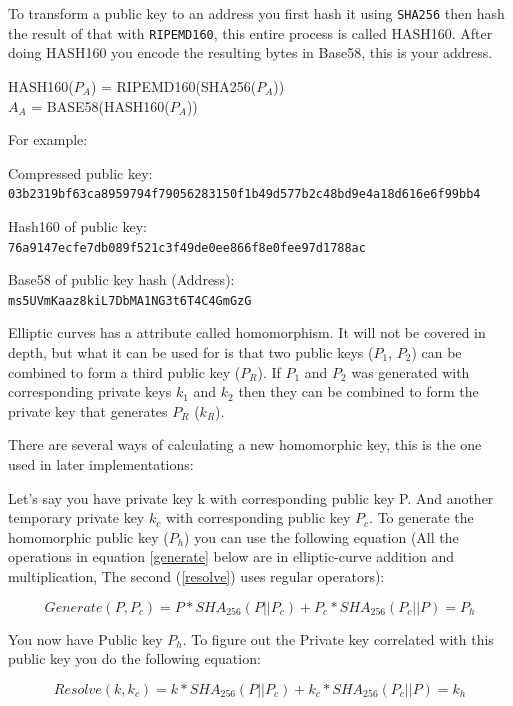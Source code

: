 To transform a public key to an address you first hash it using \texttt{SHA256} then hash the result of that with \texttt{RIPEMD160}, this entire process is called HASH160. After doing HASH160 you encode the resulting bytes in Base58, this is your address.\cite{antonopoulos_2017}

HASH160($P_A$) = RIPEMD160(SHA256($P_A$))\\
$A_A$ = BASE58(HASH160($P_A$))

For example:

Compressed public key:\\
\texttt{03b2319bf63ca8959794f79056283150f1b49d577b2c48bd9e4a18d616e6f99bb4}

Hash160 of public key:\\
\texttt{76a9147ecfe7db089f521c3f49de0ee866f8e0fee97d1788ac}

Base58 of public key hash (Address):\\
\texttt{ms5UVmKaaz8kiL7DbMA1NG3t6T4C4GmGzG}

\label{homomorphism}
Elliptic curves has a attribute called homomorphism. It will not be covered in depth, but what it can be used for is that two public keys ($P_1$, $P_2$) can be combined to form a third public key ($P_R$). If $P_1$ and $P_2$ was generated with corresponding private keys $k_1$ and $k_2$ then they can be combined to form the private key that generates $P_R$ ($k_R$).\cite{miller_1986}\cite{bolt}

There are several ways of calculating a new homomorphic key, this is the one used in later implementations:

Let's say you have private key k with corresponding public key P. And another temporary private key $k_c$ with corresponding public key $P_c$. To generate the homomorphic public key ($P_h$) you can use the following equation (All the operations in equation \ref{generate} below are in elliptic-curve addition and multiplication, The second (\ref{resolve}) uses regular operators):

\begin{equation}\label{generate}
Generate(P, P_c) = P * SHA_{256}(P || P_c) + P_c * SHA_{256}(P_c || P) = P_h
\end{equation}

You now have Public key $P_h$. To figure out the Private key correlated with this public key you do the following equation:

\begin{equation}\label{resolve}
Resolve(k, k_c) = k * SHA_{256}(P || P_c) + k_c * SHA_{256}(P_c || P) = k_h
\end{equation}

